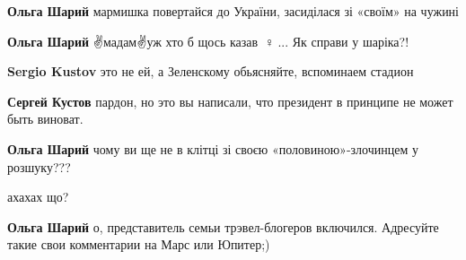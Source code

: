 \begin{itemize}
\begin{itemize}
\textbf{Ольга Шарий} мармишка повертайся до України, засиділася зі «своїм» на чужині

 
\textbf{Ольга Шарий} ✌️мадам✌️уж хто б щось казав🤦🏼♀️🤦...
Як справи у шаріка?!

 
\textbf{Sergio Kustov} это не ей, а Зеленскому обьясняйте, вспоминаем стадион

 
\textbf{Сергей Кустов} пардон, но это вы написали, что президент в принципе не может быть виноват.

 
\textbf{Ольга Шарий} чому ви ще не в клітці зі своєю «половиною»-злочинцем у розшуку???

 
ахахах що?

 
\textbf{Ольга Шарий} о, представитель семьи трэвел-блогеров включился. Адресуйте такие свои комментарии на Марс или Юпитер;)


\end{itemize}
\end{itemize}
